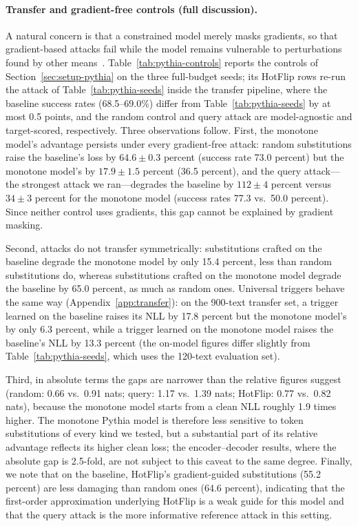 \documentclass{article}
\theoremstyle{plain}
\theoremstyle{definition}
\theoremstyle{remark}
\theoremstyle{plain}
\begin{document}
\paragraph{Transfer and gradient-free controls (full discussion).} A natural concern is that a constrained model merely masks gradients, so that gradient-based attacks fail while the model remains vulnerable to perturbations found by other means~\citep{athalye2018obfuscated,carlini2019evaluating,tramer2020adaptive}. Table~\ref{tab:pythia-controls} reports the controls of Section~\ref{sec:setup-pythia} on the three full-budget seeds; its HotFlip rows re-run the attack of Table~\ref{tab:pythia-seeds} inside the transfer pipeline, where the baseline success rates (68.5--69.0\%) differ from Table~\ref{tab:pythia-seeds} by at most 0.5 points, and the random control and query attack are model-agnostic and target-scored, respectively. Three observations follow. First, the monotone model's advantage persists under every gradient-free attack: random substitutions raise the baseline's loss by $64.6 \pm 0.3$ percent (success rate 73.0 percent) but the monotone model's by $17.9 \pm 1.5$ percent (36.5 percent), and the query attack---the strongest attack we ran---degrades the baseline by $112 \pm 4$ percent versus $34 \pm 3$ percent for the monotone model (success rates 77.3 vs.\ 50.0 percent). Since neither control uses gradients, this gap cannot be explained by gradient masking.

Second, attacks do not transfer symmetrically: substitutions crafted on the baseline degrade the monotone model by only 15.4 percent, less than random substitutions do, whereas substitutions crafted on the monotone model degrade the baseline by 65.0 percent, as much as random ones. Universal triggers behave the same way (Appendix~\ref{app:transfer}): on the 900-text transfer set, a trigger learned on the baseline raises its NLL by 17.8 percent but the monotone model's by only 6.3 percent, while a trigger learned on the monotone model raises the baseline's NLL by 13.3 percent (the on-model figures differ slightly from Table~\ref{tab:pythia-seeds}, which uses the 120-text evaluation set).

Third, in absolute terms the gaps are narrower than the relative figures suggest (random: 0.66 vs.\ 0.91 nats; query: 1.17 vs.\ 1.39 nats; HotFlip: 0.77 vs.\ 0.82 nats), because the monotone model starts from a clean NLL roughly 1.9 times higher. The monotone Pythia model is therefore less sensitive to token substitutions of every kind we tested, but a substantial part of its relative advantage reflects its higher clean loss; the encoder--decoder results, where the absolute gap is 2.5-fold, are not subject to this caveat to the same degree. Finally, we note that on the baseline, HotFlip's gradient-guided substitutions (55.2 percent) are less damaging than random ones (64.6 percent), indicating that the first-order approximation underlying HotFlip is a weak guide for this model and that the query attack is the more informative reference attack in this setting.
\end{document}
